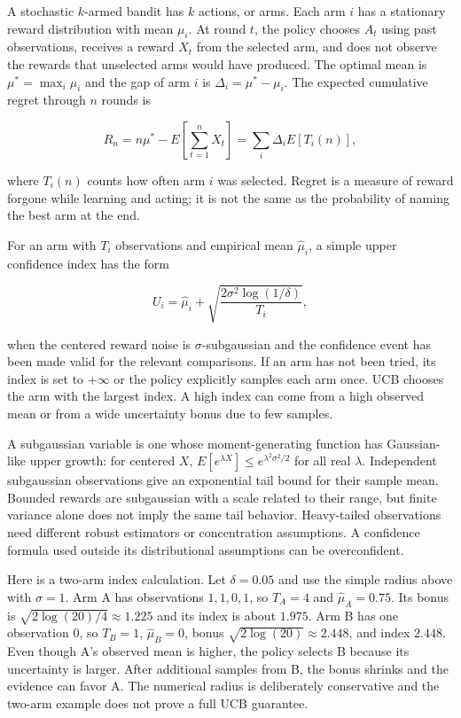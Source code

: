 \hypertarget{03-visual-computing-i-ch012-confidence-bounds-drive-exploration-under-explicit-assumptions}{}

A stochastic \(k\)-armed bandit has \(k\) actions, or arms. Each arm \(i\) has a stationary reward distribution with mean \(\mu_i\). At round \(t\), the policy chooses \(A_t\) using past observations, receives a reward \(X_t\) from the selected arm, and does not observe the rewards that unselected arms would have produced. The optimal mean is \(\mu^*=\max_i\mu_i\) and the gap of arm \(i\) is \(\Delta_i=\mu^*-\mu_i\). The expected cumulative regret through \(n\) rounds is

\[
R_n=n\mu^*-E\left[\sum_{t=1}^n X_t\right]
=\sum_i\Delta_i E[T_i(n)],
\]

where \(T_i(n)\) counts how often arm \(i\) was selected. Regret is a measure of reward forgone while learning and acting; it is not the same as the probability of naming the best arm at the end.

For an arm with \(T_i\) observations and empirical mean \(\hat\mu_i\), a simple upper confidence index has the form

\[
U_i=\hat\mu_i+\sqrt{\frac{2\sigma^2\log(1/\delta)}{T_i}},
\]

when the centered reward noise is \(\sigma\)-subgaussian and the confidence event has been made valid for the relevant comparisons. If an arm has not been tried, its index is set to \(+\infty\) or the policy explicitly samples each arm once. UCB chooses the arm with the largest index. A high index can come from a high observed mean or from a wide uncertainty bonus due to few samples.

A subgaussian variable is one whose moment-generating function has Gaussian-like upper growth: for centered \(X\), \(E[e^{\lambda X}]\le e^{\lambda^2\sigma^2/2}\) for all real \(\lambda\). Independent subgaussian observations give an exponential tail bound for their sample mean. Bounded rewards are subgaussian with a scale related to their range, but finite variance alone does not imply the same tail behavior. Heavy-tailed observations need different robust estimators or concentration assumptions. A confidence formula used outside its distributional assumptions can be overconfident.

Here is a two-arm index calculation. Let \(\delta=0.05\) and use the simple radius above with \(\sigma=1\). Arm A has observations \(1,1,0,1\), so \(T_A=4\) and \(\hat\mu_A=0.75\). Its bonus is \(\sqrt{2\log(20)/4}\approx1.225\) and its index is about \(1.975\). Arm B has one observation \(0\), so \(T_B=1\), \(\hat\mu_B=0\), bonus \(\sqrt{2\log(20)}\approx2.448\), and index \(2.448\). Even though A's observed mean is higher, the policy selects B because its uncertainty is larger. After additional samples from B, the bonus shrinks and the evidence can favor A. The numerical radius is deliberately conservative and the two-arm example does not prove a full UCB guarantee.

